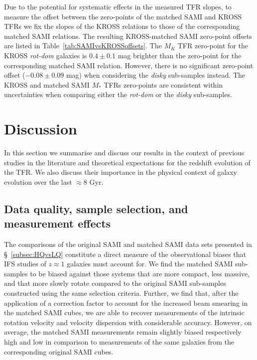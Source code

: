 \documentclass[a4paper,fleqn,usenatbib]{mnras}
\begin{document}
{Due to the potential for systematic effects in the measured TFR slopes, to measure the offset between the zero-points of the matched SAMI and KROSS TFRs we fix the slopes of the KROSS relations to those of the corresponding matched SAMI relations. The resulting KROSS-matched SAMI zero-point offsets are listed in Table~\ref{tab:SAMIvsKROSSoffsets}.  The $M_{K}$ TFR zero-point for the KROSS \textit{rot-dom} galaxies is $0.4\pm0.1$ mag brighter than the zero-point for the corresponding matched SAMI relation. However, there is no significant zero-point offset ($-0.08 \pm 0.09$ mag) when considering the \textit{disky} sub-samples instead. The KROSS and matched SAMI $M_{*}$ TFRs zero-points are consistent within uncertainties when comparing either the \textit{rot-dom} or the \textit{disky} sub-samples.
 

\section{Discussion}
\label{sec:SAMIvsKROSSdiscussion}

In this section we summarise and discuss our results in the context of previous studies in the literature and theoretical expectations for the redshift evolution of the TFR. We also discuss their importance in the physical context of galaxy evolution over the last $\approx$8 Gyr.

\subsection{Data quality, sample selection, and measurement effects}

The comparisons of the original SAMI and matched SAMI data sets presented in \S~\ref{subsec:HQvsLQ} constitute a direct measure of the observational biases that IFS studies of $z\approx1$ galaxies must account for. We find the matched SAMI sub-samples to be biased against those systems that are more compact, less massive, and that more slowly rotate compared to the original SAMI sub-samples constructed using the same selection criteria. Further, we find that, after the application of a correction factor to account for the increased beam smearing in the matched SAMI cubes, we are able to recover measurements of the intrinsic rotation velocity and velocity dispersion with considerable accuracy. However, on average, the matched SAMI measurements remain slightly biased respectively high and low in comparison to measurements of the same galaxies from the corresponding original SAMI cubes. 

}
\end{document}
